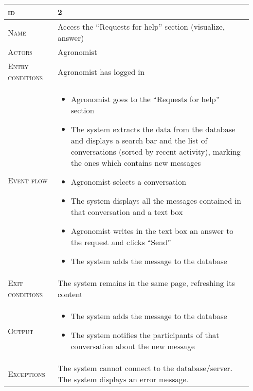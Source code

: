 \begin{table}[H]
    \centering
    \begin{tabular}[c]{|l|p{}|}
        \hline %
    	\textsc{id}                 &   2\\
    	\hline %
    	\textsc{Name}               &   Access the “Requests for help” section (visualize, answer)\\
    	\hline %
    	\textsc{Actors}             &   Agronomist\\
    	\hline %
    	\textsc{Entry conditions}   &   Agronomist has logged in\\
    	\hline %
    	\textsc{Event flow}         &   \footnotesize
            	                        \begin{itemize}
                                    	    \item Agronomist goes to the “Requests for help” section
                                    		\item The system extracts the data from the database and displays a search bar and the list of conversations (sorted by recent activity), marking the ones which contains new messages
                                    		\item Agronomist selects a conversation
                                    		\item The system displays all the messages contained in that conversation and a text box
                                    		\item Agronomist writes in the text box an answer to the request and clicks “Send”
                                    		\item The system adds the message to the database
                                        \end{itemize}\\
        \hline %
        \textsc{Exit conditions}    &  The system remains in the same page, refreshing its content\\
    	\hline %
    	\textsc{Output}             &  \begin{itemize}
    	    \item The system adds the message to the database
    	    \item The system notifies the participants of that conversation about the new message
    	\end{itemize}\\
    	\hline %
    	\textsc{Exceptions}         &  The system cannot connect to the database/server. The system displays an error message.\\
    	\hline %
        

\end{tabular}
\end{table}
